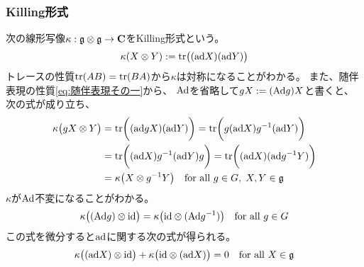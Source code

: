 {\subsubsection{Killing形式}\label{s3:Killing形式} %
	次の線形写像$\kappa:\mathfrak{g}\otimes\mathfrak{g}\to\mathbf{C}$をKilling形式という。
	\begin{equation*}\begin{split}
		\kappa(X\otimes Y) := {\operatorname{tr}}\bigl(({\operatorname{ad}} X)({\operatorname{ad}} Y)\bigr)
	\end{split}\end{equation*}
	トレースの性質${\operatorname{tr}}(AB)={\operatorname{tr}}(BA)$から$\kappa$は対称になることがわかる。
	また、随伴表現の性質\eqref{eq:随伴表現その一}から、
	${\operatorname{Ad}}$を省略して$gX:=({\operatorname{Ad}} g)X$と書くと、次の式が成り立ち、
	\begin{equation*}\begin{split}
		\kappa\bigl(gX\otimes Y\bigr)
		&= {\operatorname{tr}}\biggl(({\operatorname{ad}} gX)({\operatorname{ad}} Y)\biggr)
		= {\operatorname{tr}}\biggl(g({\operatorname{ad}} X)g^{-1}({\operatorname{ad}} Y)\biggr) \\
		&= {\operatorname{tr}}\biggl(({\operatorname{ad}} X)g^{-1}({\operatorname{ad}} Y)g\biggr)
		= {\operatorname{tr}}\biggl(({\operatorname{ad}} X)({\operatorname{ad}} g^{-1}Y)\biggr) \\
		&= \kappa\bigl(X\otimes g^{-1}Y\bigr)
			\quad\text{for all } g\in G,\; X,Y\in\mathfrak{g} \\
	\end{split}\end{equation*}
	$\kappa$が${\operatorname{Ad}}$不変になることがわかる。
	\begin{equation*}\begin{split}
		\kappa\bigl(({\operatorname{Ad}} g)\otimes{\ensuremath{\operatorname{id}}}\bigr)
		= \kappa\bigl({\operatorname{id}}\otimes({\operatorname{Ad}} g^{-1})\bigr)
		\quad\text{for all } g\in G
	\end{split}\end{equation*}
	この式を微分すると${\operatorname{ad}}$に関する次の式が得られる。
	\begin{equation*}\begin{split}
		\kappa\bigl(({\operatorname{ad}} X)\otimes{\ensuremath{\operatorname{id}}}\bigr)
		+ \kappa\bigl({\operatorname{id}}\otimes({\operatorname{ad}} X)\bigr) = 0
		\quad\text{for all } X\in \mathfrak{g}
	\end{split}\end{equation*}

}
